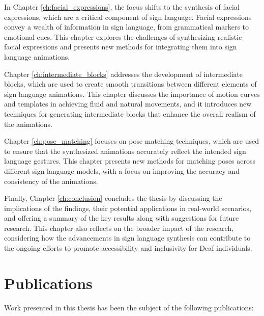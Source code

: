 \documentclass[../../main.tex]{subfiles}
\begin{document}
In Chapter \ref{ch:facial_expressions}, the focus shifts to the synthesis of facial expressions, which are a critical component of sign language. Facial expressions convey a wealth of information in sign language, from grammatical markers to emotional cues. This chapter explores the challenges of synthesizing realistic facial expressions and presents new methods for integrating them into sign language animations.

Chapter \ref{ch:intermediate_blocks} addresses the development of intermediate blocks, which are used to create smooth transitions between different elements of sign language animations. This chapter discusses the importance of motion curves and templates in achieving fluid and natural movements, and it introduces new techniques for generating intermediate blocks that enhance the overall realism of the animations.

Chapter \ref{ch:pose_matching} focuses on pose matching techniques, which are used to ensure that the synthesized animations accurately reflect the intended sign language gestures. This chapter presents new methods for matching poses across different sign language models, with a focus on improving the accuracy and consistency of the animations.

Finally, Chapter \ref{ch:conclusion} concludes the thesis by discussing the implications of the findings, their potential applications in real-world scenarios, and offering a summary of the key results along with suggestions for future research. This chapter also reflects on the broader impact of the research, considering how the advancements in sign language synthesis can contribute to the ongoing efforts to promote accessibility and inclusivity for Deaf individuals.

\section{Publications}

Work presented in this thesis has been the subject of the following publications:

\end{document}
